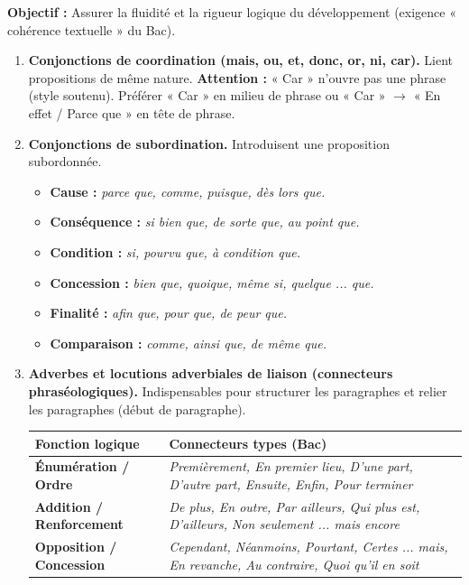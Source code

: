 \documentclass[11pt]{article}
\newcommand{\cle}[1]{{\popxbold\color{popdark}#1}}
\begin{document}
\begin{methode}
\textbf{Objectif :} Assurer la fluidité et la rigueur logique du développement (exigence « cohérence textuelle » du Bac).
\begin{enumerate}
    \item \textbf{Conjonctions de coordination (mais, ou, et, donc, or, ni, car).} Lient propositions de même nature. \textbf{Attention :} « Car » n'ouvre pas une phrase (style soutenu). Préférer « Car » en milieu de phrase ou « Car » $\to$ « En effet / Parce que » en tête de phrase.
    \item \textbf{Conjonctions de subordination.} Introduisent une proposition subordonnée.
        \begin{itemize}
            \item \textbf{Cause :} \emph{parce que, comme, puisque, dès lors que.}
            \item \textbf{Conséquence :} \emph{si bien que, de sorte que, au point que.}
            \item \textbf{Condition :} \emph{si, pourvu que, à condition que.}
            \item \textbf{Concession :} \emph{bien que, quoique, même si, quelque ... que.}
            \item \textbf{Finalité :} \emph{afin que, pour que, de peur que.}
            \item \textbf{Comparaison :} \emph{comme, ainsi que, de même que.}
        \end{itemize}
    \item \textbf{Adverbes et locutions adverbiales de liaison (connecteurs phraséologiques).} Indispensables pour \cle{structurer les paragraphes} et \cle{relier les paragraphes} (début de paragraphe).
        \begin{center}
        \begin{tabularx}{\linewidth}{|l|X|}\hline
        \rowcolor{popblueL} \textbf{Fonction logique} & \textbf{Connecteurs types (Bac)} \\ \hline
        \textbf{Énumération / Ordre} & \emph{Premièrement, En premier lieu, D'une part, D'autre part, Ensuite, Enfin, Pour terminer} \\ \hline
        \textbf{Addition / Renforcement} & \emph{De plus, En outre, Par ailleurs, Qui plus est, D'ailleurs, Non seulement ... mais encore} \\ \hline
        \textbf{Opposition / Concession} & \emph{Cependant, Néanmoins, Pourtant, Certes ... mais, En revanche, Au contraire, Quoi qu'il en soit} \\ \hline

\end{tabularx}
\end{center}
\end{enumerate}
\end{methode}
\end{document}
